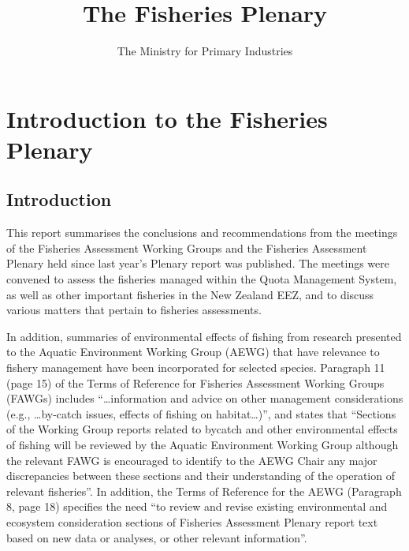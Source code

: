 \documentclass{mpi-plenary}
\title{The Fisheries Plenary}{The Fisheries Plenary}
\subtitle{}
\author{The Ministry for Primary Industries}
\newcounter{chapter}
\theoremstyle{definition}
\theoremstyle{definition}
\theoremstyle{definition}
\theoremstyle{remark}
\begin{document}
\maketitle

\thispagestyle{empty}

\setlength{\abovedisplayskip}{-5pt}
\setlength{\abovedisplayshortskip}{-5pt}

{
\hypersetup{linkcolor=}
\setcounter{tocdepth}{2}
\tableofcontents
}
\listoftables
\listoffigures
\chapter{Introduction to the Fisheries
Plenary}\label{introduction-to-the-fisheries-plenary}

\section{Introduction}\label{introduction}

This report summarises the conclusions and recommendations from the
meetings of the Fisheries Assessment Working Groups and the Fisheries
Assessment Plenary held since last year's Plenary report was published.
The meetings were convened to assess the fisheries managed within the
Quota Management System, as well as other important fisheries in the New
Zealand EEZ, and to discuss various matters that pertain to fisheries
assessments.

In addition, summaries of environmental effects of fishing from research
presented to the Aquatic Environment Working Group (AEWG) that have
relevance to fishery management have been incorporated for selected
species. Paragraph 11 (page 15) of the Terms of Reference for Fisheries
Assessment Working Groups (FAWGs) includes ``\ldots{}information and
advice on other management considerations (e.g., \ldots{}by-catch
issues, effects of fishing on habitat\ldots{})'', and states that
``Sections of the Working Group reports related to bycatch and other
environmental effects of fishing will be reviewed by the Aquatic
Environment Working Group although the relevant FAWG is encouraged to
identify to the AEWG Chair any major discrepancies between these
sections and their understanding of the operation of relevant
fisheries''. In addition, the Terms of Reference for the AEWG (Paragraph
8, page 18) specifies the need ``to review and revise existing
environmental and ecosystem consideration sections of Fisheries
Assessment Plenary report text based on new data or analyses, or other
relevant information''.
\end{document}
